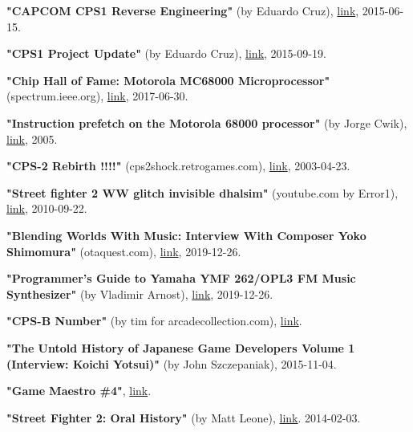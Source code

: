 \begin{thebibliography}{999}
  \textbf{"CAPCOM CPS1 Reverse Engineering"} (by Eduardo Cruz),
  \href{https://www.youtube.com/watch?v=IBZc__9sM28}{link},
  2015-06-15.

  \textbf{"CPS1 Project Update"} (by Eduardo Cruz),
  \href{http://arcadehacker.blogspot.com/2015/09/project-update.html}{link},
  2015-09-19.

  \textbf{"Chip Hall of Fame: Motorola MC68000 Microprocessor"} (spectrum.ieee.org),
  \href{https://spectrum.ieee.org/tech-history/silicon-revolution/chip-hall-of-fame-motorola-mc68000-microprocessor}{link},
  2017-06-30.

  \textbf{"Instruction prefetch on the Motorola 68000 processor"} (by Jorge Cwik),
  \href{http://pasti.fxatari.com/68kdocs/68kPrefetch.html}{link},
  2005.
  

  \textbf{"CPS-2 Rebirth !!!!"} (cps2shock.retrogames.com),
  \href{https://web.archive.org/web/20060812042251/http://cps2shock.retrogames.com/wip.html}{link},
  2003-04-23.

  \textbf{"Street fighter 2 WW glitch invisible dhalsim"} (youtube.com by Error1),
  \href{https://www.youtube.com/watch?v=qEFPzcOK_uQ}{link},
  2010-09-22.

  \textbf{"Blending Worlds With Music: Interview With Composer Yoko Shimomura"} (otaquest.com),
  \href{https://www.otaquest.com/yoko-shimomura-interview/}{link},
  2019-12-26.

  \textbf{"Programmer's Guide to Yamaha YMF 262/OPL3 FM Music Synthesizer"} (by Vladimir Arnost),
  \href{https://www.fit.vutbr.cz/~arnost/opl/opl3.html}{link},
  2019-12-26.

  \textbf{"CPS-B Number"} (by tim for arcadecollection.com),
  \href{http://www.arcadecollecting.com/info/cps-b_numbers.html}{link}.

  
  \textbf{"The Untold History of Japanese Game Developers Volume 1 (Interview: Koichi Yotsui)"} (by John Szczepaniak),
  2015-11-04.

  \textbf{"Game Maestro \#4"}, \href{http://shmuplations.com/akiman/}{link}.

  \textbf{"Street Fighter 2: Oral History"} (by Matt Leone),
  \href{https://www.polygon.com/a/street-fighter-2-oral-history/}{link}.
  2014-02-03.


\end{thebibliography}
